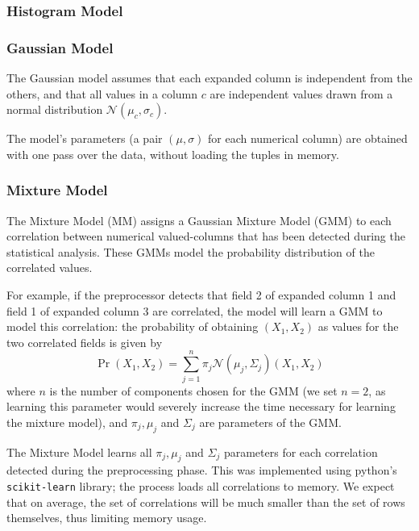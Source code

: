 
\subsubsection{Histogram Model}
\subsubsection{Gaussian Model}
The Gaussian model assumes that each expanded column is independent from the others, and that all values in a column $c$ are independent values drawn from a normal distribution $\mathcal N(\mu_c, \sigma_c)$.

The model's parameters (a pair $(\mu, \sigma)$ for each numerical column) are obtained with one pass over the data, without loading the tuples in memory.

\subsubsection{Mixture Model}

The Mixture Model (MM) assigns a Gaussian Mixture Model (GMM) to each correlation between numerical valued-columns that has been detected during the statistical analysis. These GMMs model the probability distribution of the correlated values.

For example, if the preprocessor detects that field 2 of expanded column 1 and field 1 of expanded column 3 are correlated, the model will learn a GMM to model this correlation: the probability of obtaining $(X_1, X_2)$ as values for the two correlated fields is given by
\[\Pr(X_1, X_2) = \sum_{j=1}^{n} \pi_j \mathcal N(\mu_j, \Sigma_j)(X_1, X_2)\]
where $n$ is the number of components chosen for the GMM (we set $n=2$, as learning this parameter would severely increase the time necessary for learning the mixture model), and $\pi_j, \mu_j$ and $\Sigma_j$ are parameters of the GMM. 

The Mixture Model learns all  $\pi_j, \mu_j$ and $\Sigma_j$ parameters for each correlation detected during the preprocessing phase. This was implemented using python's \texttt{scikit-learn} library; the process loads all correlations to memory. We expect that on average, the set of correlations will be much smaller than the set of rows themselves, thus limiting memory usage.

